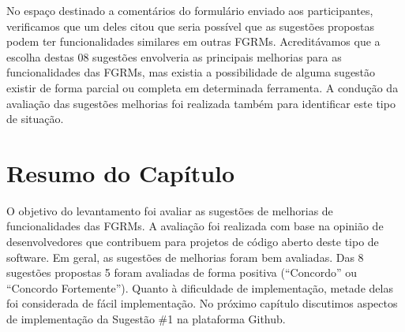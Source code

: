
No espaço destinado a comentários do formulário enviado aos participantes,
verificamos que um deles citou que seria possível que as sugestões propostas
podem ter funcionalidades similares em outras FGRMs. Acreditávamos que a
escolha destas 08 sugestões envolveria as principais melhorias para as
funcionalidades das FGRMs, mas existia a possibilidade de alguma sugestão
existir de forma parcial ou completa em determinada ferramenta. A condução da
avaliação das sugestões melhorias foi realizada também para identificar este
tipo de situação.

\section{Resumo do Capítulo}\label{sec:sug_melhoria_resumo}

O objetivo do levantamento foi avaliar as sugestões de melhorias de
funcionalidades das FGRMs. A avaliação foi realizada com base na opinião de
desenvolvedores que contribuem para projetos de código aberto deste tipo de
software. Em geral, as sugestões de melhorias foram bem avaliadas. Das 8
sugestões propostas 5 foram avaliadas de forma positiva (``Concordo'' ou
``Concordo Fortemente''). Quanto à dificuldade de implementação, metade delas
foi considerada de fácil implementação. No próximo capítulo discutimos aspectos
de implementação da Sugestão \#1 na plataforma Github.
